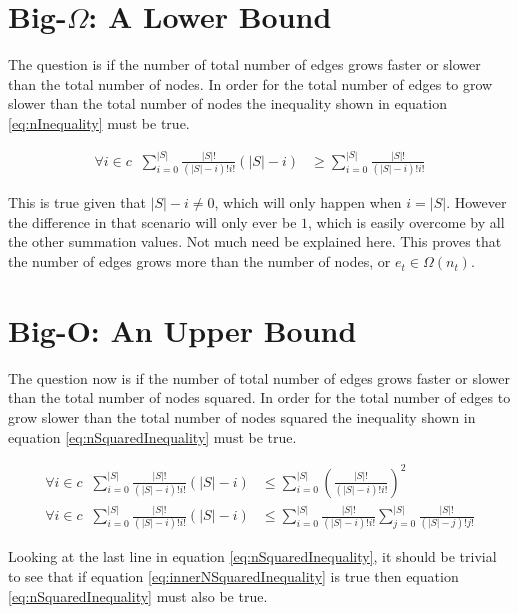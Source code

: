 \documentclass{article}
\begin{document}
\section{Big-$\Omega$: A Lower Bound}
\label{sec:LowerBound}

The question is if the number of total number of edges grows faster or slower than the total number of nodes. In order for the total number of edges to grow slower than the total number of nodes the inequality shown in equation \ref{eq:nInequality} must be true.

\begin{equation}
    \begin{split}
        \forall i\in c\;\; \sum_{i=0}^{|S|}\frac{|S|!}{(|S|-i)!i!}(|S|-i) & \ge \sum_{i=0}^{|S|}\frac{|S|!}{(|S|-i)!i!}
    \end{split}
    \label{eq:nInequality}
\end{equation}

This is true given that $|S|-i\neq0$, which will only happen when $i=|S|$. However the difference in that scenario will only ever be $1$, which is easily overcome by all the other summation values. Not much need be explained here. This proves that the number of edges grows more than the number of nodes, or $e_t\in \Omega(n_t)$.

\section{Big-O: An Upper Bound}
\label{sec:UpperBound}

The question now is if the number of total number of edges grows faster or slower than the total number of nodes squared. In order for the total number of edges to grow slower than the total number of nodes squared the inequality shown in equation \ref{eq:nSquaredInequality} must be true.

\begin{equation}
    \begin{split}
        \forall i\in c\;\; \sum_{i=0}^{|S|}\frac{|S|!}{(|S|-i)!i!}(|S|-i) & \le \sum_{i=0}^{|S|}\left(\frac{|S|!}{(|S|-i)!i!}\right)^2
        \\
        \forall i\in c\;\; \sum_{i=0}^{|S|}\frac{|S|!}{(|S|-i)!i!}(|S|-i) & \le \sum_{i=0}^{|S|}\frac{|S|!}{(|S|-i)!i!}\sum_{j=0}^{|S|}\frac{|S|!}{(|S|-j)!j!}
    \end{split}
    \label{eq:nSquaredInequality}
\end{equation}

Looking at the last line in equation \ref{eq:nSquaredInequality}, it should be trivial to see that if equation \ref{eq:innerNSquaredInequality} is true then equation \ref{eq:nSquaredInequality} must also be true.
\end{document}
